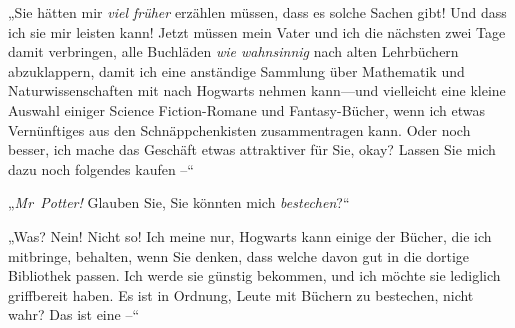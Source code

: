 „Sie hätten mir \emph{viel früher} erzählen müssen, dass es solche Sachen gibt! Und dass ich sie mir leisten kann! Jetzt müssen mein Vater und ich die nächsten zwei Tage damit verbringen, alle Buchläden \emph{wie wahnsinnig} nach alten Lehrbüchern abzuklappern, damit ich eine anständige Sammlung über Mathematik und Naturwissenschaften mit nach Hogwarts nehmen kann—und vielleicht eine kleine Auswahl einiger Science Fiction-Romane und Fantasy-Bücher, wenn ich etwas Vernünftiges aus den Schnäppchenkisten zusammentragen kann. Oder noch besser, ich mache das Geschäft etwas attraktiver für Sie, okay? Lassen Sie mich dazu noch folgendes kaufen –“

„\emph{Mr~Potter!} Glauben Sie, Sie könnten mich \emph{bestechen}?“

„Was? Nein! Nicht so! Ich meine nur, Hogwarts kann einige der Bücher, die ich mitbringe, behalten, wenn Sie denken, dass welche davon gut in die dortige Bibliothek passen. Ich werde sie günstig bekommen, und ich möchte sie lediglich griffbereit haben. Es ist in Ordnung, Leute mit Büchern zu bestechen, nicht wahr? Das ist eine –“

